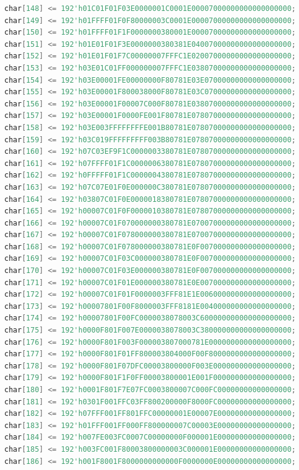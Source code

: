 \documentclass[UTF8]{article}
\theoremstyle{MyLineTheoremStyle} %
\theoremstyle{MyBlockTheoremStyle} %
\theoremstyle{MySubsubsectionStyle} %
\begin{document}
\begin{lstlisting}[language=Verilog, caption={小组成员姓名显示Verilog代码修改部分}, label={lst:verilog_code2}]
char[148] <= 192'h01C01F01F03E0000001C0001E00007000000000000000000;
char[149] <= 192'h01FFFF01F0F80000003C0001E00007000000000000000000;
char[150] <= 192'h01FFFF01F1F0000000380001E00007000000000000000000;
char[151] <= 192'h01E01F01F3E0000000380381E04007000000000000000000;
char[152] <= 192'h01E01F01F7C00000007FFFC1E02007000000000000000000;
char[153] <= 192'h03E01C01FF000000007FFFC1E03807000000000000000000;
char[154] <= 192'h03E00001FE00000000F80781E03E07000000000000000000;
char[155] <= 192'h03E00001F800038000F80781E03C07000000000000000000;
char[156] <= 192'h03E00001F00007C000F80781E03807000000000000000000;
char[157] <= 192'h03E00001F0000FE001F80781E07807000000000000000000;
char[158] <= 192'h03E003FFFFFFFFE001B80781E07807000000000000000000;
char[159] <= 192'h03C019FFFFFFFFF003B80781E07807000000000000000000;
char[160] <= 192'h07C03EF9F1C0000003380781E07807000000000000000000;
char[161] <= 192'h07FFFF01F1C0000006380781E07807000000000000000000;
char[162] <= 192'h0FFFFF01F1C0000004380781E07807000000000000000000;
char[163] <= 192'h07C07E01F0E000000C380781E07807000000000000000000;
char[164] <= 192'h03807C01F0E0000018380781E07807000000000000000000;
char[165] <= 192'h00007C01F0F0000010380781E07807000000000000000000;
char[166] <= 192'h00007C01F070000000380781E07007000000000000000000;
char[167] <= 192'h00007C01F078000000380781E07007000000000000000000;
char[168] <= 192'h00007C01F078000000380781E0F007000000000000000000;
char[169] <= 192'h00007C01F03C000000380781E0F007000000000000000000;
char[170] <= 192'h00007C01F03E000000380781E0F007000000000000000000;
char[171] <= 192'h00007C01F01E000000380781E0E007000000000000000000;
char[172] <= 192'h00007C01F01F0000003FFF81E1E006000000000000000000;
char[173] <= 192'h00007801F00F8000003FFF8181E004000000000000000000;
char[174] <= 192'h00007801F00FC0000038078003C600000000000000000000;
char[175] <= 192'h0000F801F007E0000038078003C380000000000000000000;
char[176] <= 192'h0000F801F003F000003807000781E0000000000000000000;
char[177] <= 192'h0000F801F01FF800003804000F00F8000000000000000000;
char[178] <= 192'h0000F801F07DFC00003800000F003E000000000000000000;
char[179] <= 192'h0000F801F1F0FF00003800001E001F000000000000000000;
char[180] <= 192'h0001F801F7E07FC0003800007C000FC00000000000000000;
char[181] <= 192'h0301F001FFC03FF800200000F8000FC00000000000000000;
char[182] <= 192'h07FFF001FF801FFC00000001E00007E00000000000000000;
char[183] <= 192'h01FFF001FF000FF800000007C00003E00000000000000000;
char[184] <= 192'h007FE003FC0007C00000000F000001E00000000000000000;
char[185] <= 192'h003FC001F80003800000003C000001E00000000000000000;
char[186] <= 192'h001F8001F8000000000000F0000000E00000000000000000;

\end{lstlisting}
\end{document}
